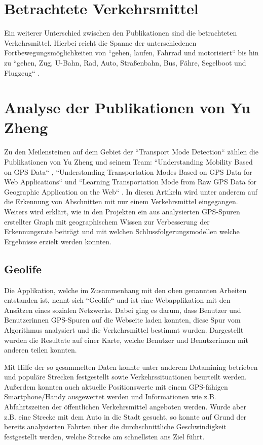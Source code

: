 \section{Betrachtete Verkehrsmittel}
Ein weiterer Unterschied zwischen den Publikationen sind die betrachteten Verkehrsmittel. Hierbei reicht die Spanne der unterschiedenen Fortbewegungsmöglichkeiten von ``gehen, laufen, Fahrrad und motorisiert`` \cite{reddy_using_2010} bis hin zu ``gehen, Zug, U-Bahn, Rad, Auto, Straßenbahn, Bus, Fähre, Segelboot und Flugzeug`` \cite{biljecki_transportation_2013}.

\section{Analyse der Publikationen von Yu Zheng}
Zu den Meilensteinen auf dem Gebiet der ``Transport Mode Detection`` zählen die Publikationen von Yu Zheng und seinem Team: ``Understanding Mobility Based on GPS Data`` \cite{zheng_understanding_2008}, ``Understanding Transportation Modes Based on GPS Data for Web Applications`` \cite{zheng_understanding_2010} und ``Learning Transportation Mode from Raw GPS Data for Geographic Application on the Web`` \cite{zheng_learning_2008}. In diesen Artikeln wird unter anderem auf die Erkennung von Abschnitten mit nur einem Verkehrsmittel eingegangen. Weiters wird erklärt, wie in den Projekten ein aus analysierten GPS-Spuren erstellter Graph mit geographischem Wissen zur Verbesserung der Erkennungsrate beiträgt und mit welchen Schlussfolgerungsmodellen welche Ergebnisse erzielt werden konnten. 

\subsection{Geolife}
Die Applikation, welche im Zusammenhang mit den oben genannten Arbeiten entstanden ist, nennt sich ``Geolife`` und ist eine Webapplikation mit den Ansätzen eines sozialen Netzwerks. Dabei ging es darum, dass Benutzer und Benutzerinnen GPS-Spuren auf die Webseite laden konnten, diese Spur vom Algorithmus analysiert und die Verkehrsmittel bestimmt wurden. Dargestellt wurden die Resultate auf einer Karte, welche Benutzer und Benutzerinnen mit anderen teilen konnten.

Mit Hilfe der so gesammelten Daten konnte unter anderem Datamining betrieben und populäre Strecken festgestellt sowie Verkehrssituationen beurteilt werden. Außerdem konnten auch aktuelle Positionswerte mit einem GPS-fähigen Smartphone/Handy ausgewertet werden und Informationen wie z.B. Abfahrtszeiten der öffentlichen Verkehrsmittel angeboten werden. Wurde aber z.B. eine Strecke mit dem Auto in die Stadt gesucht, so konnte auf Grund der bereits analysierten Fahrten über die durchschnittliche Geschwindigkeit festgestellt werden, welche Strecke am schnellsten ans Ziel führt.

